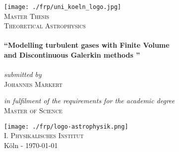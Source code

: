 \newcommand{\expNr}{04}
\newcommand{\expTitle}{}
\newcommand{\releaseDate}{\today}

\begin{titlepage}
\begin{center}

\texttt{[image: ./frp/uni\_koeln\_logo.jpg]}\\[1.0cm]  

\textsc{\LARGE Master Thesis}
\textsc{\Large }\\[0.8cm]
\textsc{\Large Theoretical Astrophysics}\\[0.5cm]

\HRule\\[0.7cm]
{ \LARGE \bfseries \textquotedblleft Modelling turbulent gases with Finite Volume \\[0.4cm] and Discontinuous Galerkin methods \textquotedblright}\\[0.6cm]
\HRule \\[0.7cm]

\vspace{1cm}
\large \emph{submitted by}\\[0.4cm]
\textsc{\LARGE Johannes Markert}\\[1cm]
\vspace{0.2cm}

\large \emph{in fulfilment of the requirements for the academic degree}\\[0.4cm]
\textsc{\LARGE Master of Science}
\vspace{2.0cm}

\texttt{[image: ./frp/logo-astrophysik.png]}\\
\textsc{\large I. Physikalisches Institut}\\[1cm]

\vfill
K\"oln - \releaseDate 

\end{center}
\end{titlepage}


\cleardoubleemptypage
